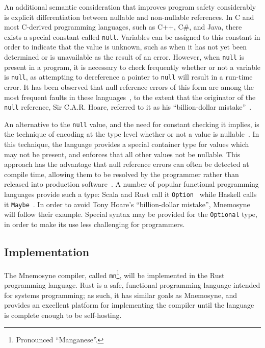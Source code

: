 \documentclass[11pt,a4paper]{article}
\theoremstyle{break}
\begin{document}
An additional semantic consideration that improves program safety considerably is explicit differentiation between nullable and non-nullable references. In C and most C-derived programming languages, such as C++, C\#, and Java, there exists a special constant called \texttt{null}. Variables can be assigned to this constant in order to indicate that the value is unknown, such as when it has not yet been determined or is unavailable as the result of an error. However, when \texttt{null} is present in a program, it is necessary to check frequently whether or not a variable is \texttt{null}, as attempting to dereference a pointer to \texttt{null} will result in a run-time error. It has been observed that null reference errors of this form are among the most frequent faults in these languages~\cite{Duff:2009:GNC:1541788.1541792,Chalin:2007:NRD:2394758.2394776,Fahndrich:2003:DCN:949343.949332}, to the extent that the originator of the \texttt{null} reference, Sir C.A.R. Hoare, referred to it as his ``billion-dollar mistake''~\cite{hoare2009null}.

An alternative to the \texttt{null} value, and the need for constant checking it implies, is the technique of encoding at the type level whether or not a value is nullable~\cite{Fahndrich:2003:DCN:949343.949332}. In this technique, the language provides a special container type for values which may not be present, and enforces that all other values not be nullable. This approach has the advantage that null reference errors can often be detected at compile time, allowing them to be resolved by the programmer rather than released into production software~\cite{Fahndrich:2003:DCN:949343.949332}. A number of popular functional programming languages provide such a type: Scala and Rust call it \texttt{Option}~\cite{odersky2004scala,odersky2004overview,Matsakis:2014:RL:2663171.2663188} while Haskell calls it \texttt{Maybe}~\cite{jones2003haskell,hudak1992gentle}. In order to avoid Tony Hoare's ``billion-dollar mistake'', Mnemosyne will follow their example. Special syntax may be provided for the \texttt{Optional} type, in order to make its use less challenging for programmers.

\subsection{Implementation}

The Mnemosyne compiler, called \texttt{mn}\footnote{Pronounced ``Manganese''.}, will be implemented in the Rust programming language. Rust is a safe, functional programming language intended for systems programming; as such, it has similar goals as Mnemosyne, and provides an excellent platform for implementing the compiler until the language is complete enough to be self-hosting.
\end{document}
